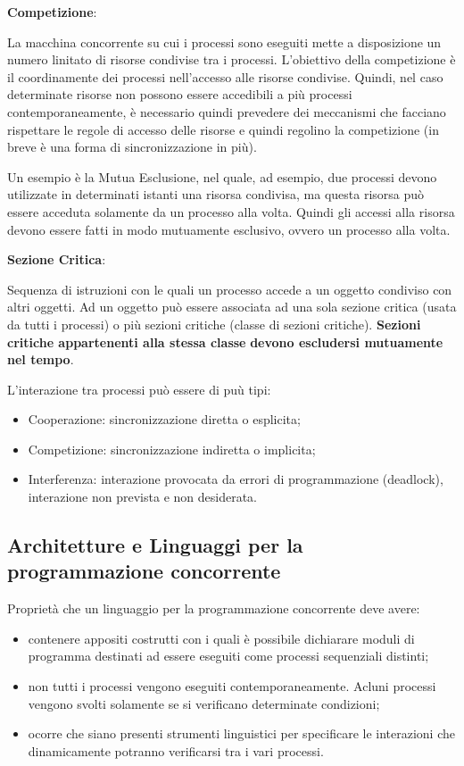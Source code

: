 \documentclass{article}
\begin{document}
\vspace{3mm}
\textbf{Competizione}:

La macchina concorrente su cui i processi sono eseguiti mette a disposizione un numero linitato di risorse condivise tra i processi.
L'obiettivo della competizione è il coordinamente dei processi nell'accesso alle risorse condivise. Quindi, nel caso determinate risorse non
possono essere accedibili a più processi contemporaneamente, è necessario quindi prevedere dei meccanismi che facciano rispettare le regole di accesso
delle risorse e quindi regolino la competizione (in breve è una forma di sincronizzazione in più).

Un esempio è la Mutua Esclusione, nel quale, ad esempio, due processi devono utilizzate in determinati istanti una risorsa condivisa, ma questa
risorsa può essere acceduta solamente da un processo alla volta. Quindi gli accessi alla risorsa devono essere fatti in modo mutuamente esclusivo, ovvero
un processo alla volta.

\vspace{3mm}
\textbf{Sezione Critica}:

Sequenza di istruzioni con le quali un processo accede a un oggetto condiviso con altri oggetti. Ad un oggetto può essere associata ad una sola
sezione critica (usata da tutti i processi) o più sezioni critiche (classe di sezioni critiche). \textbf{Sezioni critiche appartenenti alla stessa classe}
\textbf{devono escludersi mutuamente nel tempo}.

\vspace{3mm}
L'interazione tra processi può essere di puù tipi:
\begin{itemize}
    \item Cooperazione: sincronizzazione diretta o esplicita;
    \item Competizione: sincronizzazione indiretta o implicita;
    \item Interferenza: interazione provocata da errori di programmazione (deadlock), interazione non prevista e non desiderata.
\end{itemize}

\subsection{Architetture e Linguaggi per la programmazione concorrente}

Proprietà che un linguaggio per la programmazione concorrente deve avere:
\begin{itemize}
    \item contenere appositi costrutti con i quali è possibile dichiarare moduli di programma destinati ad essere eseguiti come processi sequenziali distinti;
    \item non tutti i processi vengono eseguiti contemporaneamente. Acluni processi vengono svolti solamente se si verificano determinate condizioni;
    \item ocorre che siano presenti strumenti linguistici per specificare le interazioni che dinamicamente potranno verificarsi tra i vari processi.
\end{itemize}
\end{document}
